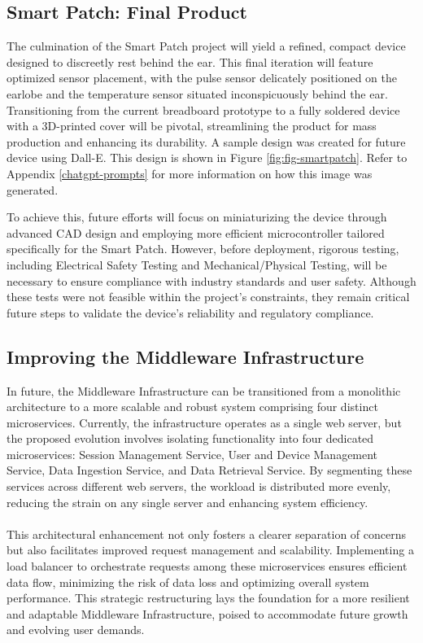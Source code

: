 \subsection{Smart Patch: Final Product}
The culmination of the Smart Patch project will yield a refined, compact device designed to discreetly rest behind the ear. This final iteration will feature optimized sensor placement, with the pulse sensor delicately positioned on the earlobe and the temperature sensor situated inconspicuously behind the ear. Transitioning from the current breadboard prototype to a fully soldered device with a 3D-printed cover will be pivotal, streamlining the product for mass production and enhancing its durability. A sample design was created for future device using Dall-E. This design is shown in Figure \ref{fig:fig-smartpatch}. Refer to Appendix \ref{chatgpt-prompts} for more information on how this image was generated. 

\noindent To achieve this, future efforts will focus on miniaturizing the device through advanced CAD design and employing more efficient microcontroller tailored specifically for the Smart Patch. However, before deployment, rigorous testing, including Electrical Safety Testing and Mechanical/Physical Testing, will be necessary to ensure compliance with industry standards and user safety. Although these tests were not feasible within the project's constraints, they remain critical future steps to validate the device's reliability and regulatory compliance.


\subsection{Improving the Middleware Infrastructure}
In future, the Middleware Infrastructure can be transitioned from a monolithic architecture to a more scalable and robust system comprising four distinct microservices. Currently, the infrastructure operates as a single web server, but the proposed evolution involves isolating functionality into four dedicated microservices: Session Management Service, User and Device Management Service, Data Ingestion Service, and Data Retrieval Service. By segmenting these services across different web servers, the workload is distributed more evenly, reducing the strain on any single server and enhancing system efficiency. \\ \\
This architectural enhancement not only fosters a clearer separation of concerns but also facilitates improved request management and scalability. Implementing a load balancer to orchestrate requests among these microservices ensures efficient data flow, minimizing the risk of data loss and optimizing overall system performance. This strategic restructuring lays the foundation for a more resilient and adaptable Middleware Infrastructure, poised to accommodate future growth and evolving user demands.

